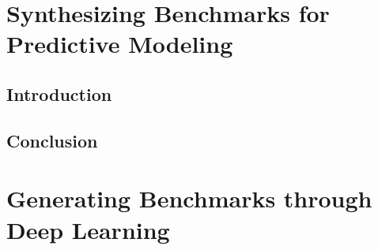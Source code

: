 \ifstapled
\chapter{Synthesizing Benchmarks for Predictive Modeling}
\section{Introduction}
\lipsum[1-2]

\section{Conclusion}
\lipsum[1-2]
\else
\chapter{Generating Benchmarks through Deep Learning}
\label{chap:clgen}









\fi